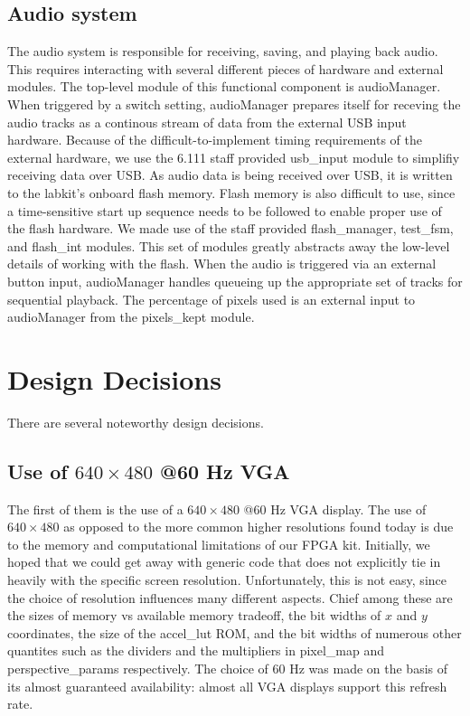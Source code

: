 \documentclass{article}
\begin{document}
\subsection{Audio system}
The audio system is responsible for receiving, saving, and playing back audio. 
This requires interacting with several different pieces of hardware and external modules. 
The top-level module of this functional component is audioManager.
When triggered by a switch setting, audioManager prepares itself for receving the audio tracks as a continous stream of data from the external USB input hardware. 
Because of the difficult-to-implement timing requirements of the external hardware, we use the 6.111 staff provided usb\_input module to simplifiy receiving data over USB. 
As audio data is being received over USB, it is written to the labkit's onboard flash memory. 
Flash memory is also difficult to use, since a time-sensitive start up sequence needs to be followed to enable proper use of the flash hardware. 
We made use of the staff provided flash\_manager, test\_fsm, and flash\_int modules. This set of modules greatly abstracts away the low-level details of working with the flash. 
When the audio is triggered via an external button input, audioManager handles queueing up the appropriate set of tracks for sequential playback. The percentage of pixels used is an external input to audioManager from the pixels\_kept module. 

\section{Design Decisions}

There are several noteworthy design decisions.

\subsection{Use of $640 \times 480$ @60 Hz VGA}
The first of them is the use of a $640 \times 480$ @60 Hz VGA display.
The use of $640 \times 480$  as opposed to the more common higher resolutions found today is due to the memory and computational limitations of our FPGA kit.
Initially, we hoped that we could get away with generic code that does not explicitly tie in heavily with the specific screen resolution.
Unfortunately, this is not easy, since the choice of resolution influences many different aspects.
Chief among these are the sizes of memory vs available memory tradeoff, the bit widths of $x$ and $y$ coordinates, the size of the accel\_lut ROM,
and the bit widths of numerous other quantites such as the dividers and the multipliers in pixel\_map and perspective\_params respectively.
The choice of 60 Hz was made on the basis of its almost guaranteed availability: almost all VGA displays support this refresh rate.
\end{document}
